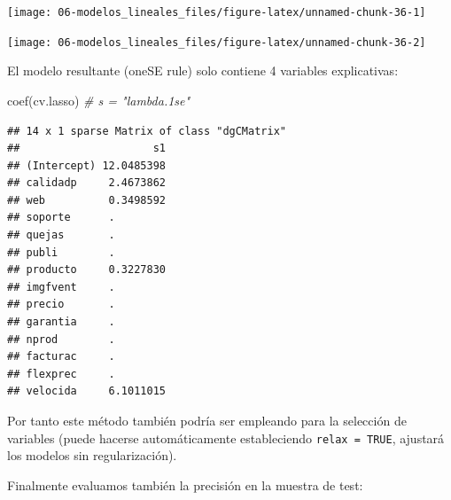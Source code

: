 \documentclass[
  spanish,
]{book}
\newenvironment{Shaded}{\begin{snugshade}}{\end{snugshade}}
\newcommand{\AttributeTok}[1]{\textcolor[rgb]{0.77,0.63,0.00}{#1}}
\newcommand{\CommentTok}[1]{\textcolor[rgb]{0.56,0.35,0.01}{\textit{#1}}}
\newcommand{\ConstantTok}[1]{\textcolor[rgb]{0.00,0.00,0.00}{#1}}
\newcommand{\DecValTok}[1]{\textcolor[rgb]{0.00,0.00,0.81}{#1}}
\newcommand{\FloatTok}[1]{\textcolor[rgb]{0.00,0.00,0.81}{#1}}
\newcommand{\FunctionTok}[1]{\textcolor[rgb]{0.00,0.00,0.00}{#1}}
\newcommand{\NormalTok}[1]{#1}
\newcommand{\SpecialCharTok}[1]{\textcolor[rgb]{0.00,0.00,0.00}{#1}}
\newcommand{\StringTok}[1]{\textcolor[rgb]{0.31,0.60,0.02}{#1}}
\theoremstyle{break}
\theoremstyle{definition}
\theoremstyle{definition}
\theoremstyle{definition}
\theoremstyle{definition}
\theoremstyle{remark}
\begin{document}
\begin{center}\texttt{[image: 06-modelos\_lineales\_files/figure-latex/unnamed-chunk-36-1]} \end{center}

\begin{Shaded}
\end{Shaded}

\begin{center}\texttt{[image: 06-modelos\_lineales\_files/figure-latex/unnamed-chunk-36-2]} \end{center}

El modelo resultante (oneSE rule) solo contiene 4 variables explicativas:

\begin{Shaded}
\begin{Highlighting}[]
\FunctionTok{coef}\NormalTok{(cv.lasso) }\CommentTok{\# s = "lambda.1se"}
\end{Highlighting}
\end{Shaded}

\begin{verbatim}
## 14 x 1 sparse Matrix of class "dgCMatrix"
##                     s1
## (Intercept) 12.0485398
## calidadp     2.4673862
## web          0.3498592
## soporte      .        
## quejas       .        
## publi        .        
## producto     0.3227830
## imgfvent     .        
## precio       .        
## garantia     .        
## nprod        .        
## facturac     .        
## flexprec     .        
## velocida     6.1011015
\end{verbatim}

Por tanto este método también podría ser empleando para la selección de variables (puede hacerse automáticamente estableciendo \texttt{relax\ =\ TRUE}, ajustará los modelos sin regularización).

Finalmente evaluamos también la precisión en la muestra de test:
\end{document}
